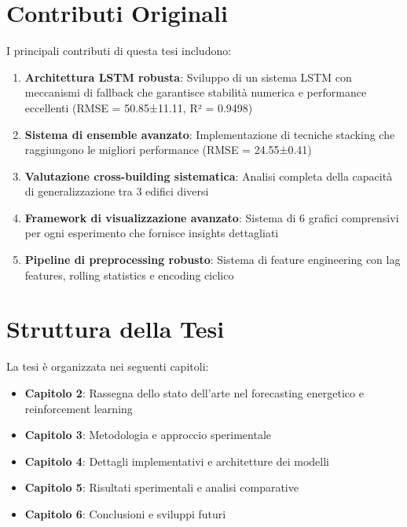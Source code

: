 \documentclass[12pt,a4paper,twoside]{report}
\begin{document}
\section{Contributi Originali}

I principali contributi di questa tesi includono:

\begin{enumerate}
    \item \textbf{Architettura LSTM robusta}: Sviluppo di un sistema LSTM con meccanismi di fallback che garantisce stabilità numerica e performance eccellenti (RMSE = 50.85±11.11, R² = 0.9498)
    
    \item \textbf{Sistema di ensemble avanzato}: Implementazione di tecniche stacking che raggiungono le migliori performance (RMSE = 24.55±0.41)
    
    \item \textbf{Valutazione cross-building sistematica}: Analisi completa della capacità di generalizzazione tra 3 edifici diversi
    
    \item \textbf{Framework di visualizzazione avanzato}: Sistema di 6 grafici comprensivi per ogni esperimento che fornisce insights dettagliati
    
    \item \textbf{Pipeline di preprocessing robusto}: Sistema di feature engineering con lag features, rolling statistics e encoding ciclico
\end{enumerate}

\section{Struttura della Tesi}

La tesi è organizzata nei seguenti capitoli:

\begin{itemize}
    \item \textbf{Capitolo 2}: Rassegna dello stato dell'arte nel forecasting energetico e reinforcement learning
    \item \textbf{Capitolo 3}: Metodologia e approccio sperimentale
    \item \textbf{Capitolo 4}: Dettagli implementativi e architetture dei modelli
    \item \textbf{Capitolo 5}: Risultati sperimentali e analisi comparative
    \item \textbf{Capitolo 6}: Conclusioni e sviluppi futuri
\end{itemize}
\end{document}
